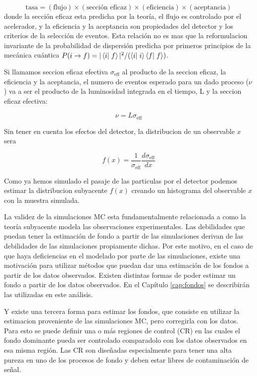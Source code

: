\begin{equation}
  \text{tasa} = (\text{flujo}) \times (\text{sección eficaz}) \times (\text{eficiencia}) \times (\text{aceptancia})
\end{equation}
%
donde la sección eficaz esta predicha por la teoría, el flujo es controlado por
el acelerador, y la eficiencia y la aceptancia son propiedades del detector y los
criterios de la selección de eventos. Esta relación no es mas que la reformulacion
invariante de la probabilidad de dispersión predicha por primeros principios de la
mecánica cuántica $P(i\to f) = |\braket{i}{f}|^2/(\braket{i}{i}\braket{f}{f})$.

Si llamamos seccion eficaz efectiva $\sigma_\text{eff}$ al producto de la seccion eficaz,
la eficiencia y la aceptancia, el numero de eventos esperado para un dado proceso ($\nu$)
va a ser el producto de la luminosidad integrada en el tiempo, L y la seccion eficaz efectiva:

\begin{equation}
  \nu = L \sigma_\text{eff}
\end{equation}

Sin tener en cuenta los efectos del detector, la distribucion de un observable $x$ sera

\begin{equation}
 f(x) = \frac{1}{\sigma_\text{eff}} \frac{d\sigma_\text{eff}}{dx}
\end{equation}

Como ya hemos simulado el pasaje de las particulas por el detector podemos estimar
la distribucion subyacente $f(x)$ creando un histograma del observable $x$ con la muestra
simulada.

La validez de la simulaciones MC esta fundamentalmente relacionada a como la teoría
subyacente modela las observaciones experimentales. Las debilidades que puedan tener
la estimación de fondo a partir de las simulaciones derivan de las debilidades
de las simulaciones propiamente dichas. Por este motivo, en el caso de que haya
deficiencias en el modelado por parte de las simulaciones, existe una motivación
para utilizar métodos que puedan dar una estimación de los fondos a partir de los
datos observados. Existen distintas formas de poder estimar un fondo a partir
de los datos observados. En el Capítulo \ref{cap:fondos} se describirán las utilizadas
en este análisis.

Y existe una tercera forma para estimar los fondos, que consiste en utilizar la estimacion
proveniente de las simulaciones MC, pero corregirla con los datos. Para
esto se puede definir una o más regiones de control (CR) en las cuales el fondo dominante
pueda ser controlado comparadolo con los datos observados en esa misma región. Las CR
son diseñadas especialmente para tener una alta pureza en uno de los procesos de fondo
y deben estar libres de contaminación de señal.

